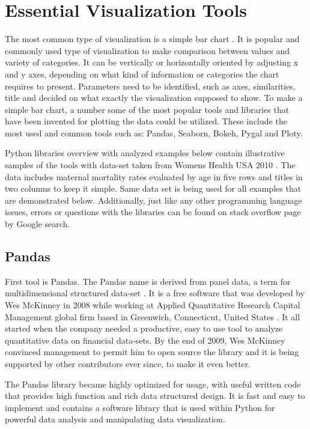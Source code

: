 \documentclass[sigconf]{acmart}
\begin{document}
\section{Essential Visualization Tools}

The most common type of visualization is a simple bar chart \cite{robbins2012creating}. It is popular and commonly used type of visualization to make comparison between values and variety of categories. It can be vertically or horizontally oriented by adjusting x and y axes, depending on what kind of information or categories the chart requires to  present. Parameters need to be identified, such as axes, similarities, title and decided on what exactly the visualization supposed to show. To make a simple bar chart, a number some of the most popular tools and libraries that have been invented for plotting the data could be utilized. These include the most used and common tools such as: Pandas, Seaborn, Bokeh,  Pygal and Ploty.

Python libraries overview with analyzed examples below contain illustrative samples of the tools with data-set taken from Women\textquotesingle s Health USA 2010 \cite{ogden2002centers}. The data includes maternal mortality rates evaluated by age in five rows and titles in two columns to keep it simple. Same data set is being used for all examples that are demonstrated below. Additionally, just like any other programming language issues, errors or questions with the libraries can be found on stack overflow page by Google search.

\subsection{Pandas}

First tool is Pandas. The Pandas name is derived from panel data, a term for multidimensional structured data-set \cite{mckinney2012python}. It is a free software that was developed by Wes McKinney in 2008 while working at Applied Quantitative Research Capital Management global firm based in Greenwich, Connecticut, United States \cite{mckinney2012python}. It all started when the company needed a productive, easy to use tool to analyze quantitative data on financial data-sets. By the end of 2009, Wes McKinney convinced management to permit him to open source the library and it is being supported by other contributors ever since, to make it even better.

The Pandas library became highly optimized for usage, with useful written code that provides high function and rich data structured design. It is fast and easy to implement and contains a software library that is used within Python for powerful data analysis and manipulating data visualization.
\end{document}
